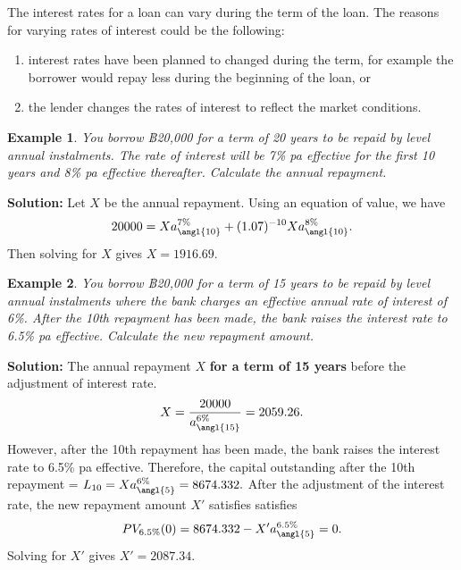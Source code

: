 \documentclass[landscape, 20pt]{extreport}
\theoremstyle{definition}
\theoremstyle{definition}
\newtheorem{example}{Example}[chapter]
\theoremstyle{definition}
\theoremstyle{definition}
\theoremstyle{remark}
\begin{document}
The interest rates for a loan can vary during the term of the loan. The
reasons for varying rates of interest could be the following:

\begin{enumerate}
\def\labelenumi{\arabic{enumi}.}
\item
  interest rates have been planned to changed during the term, for
  example the borrower would repay less during the beginning of the
  loan, or
\item
  the lender changes the rates of interest to reflect the market
  conditions.
\end{enumerate}

\newpage \begin{example}
\emph{You borrow ฿20,000 for a term of 20 years to be repaid by level annual
instalments. The rate of interest will be 7\% pa effective for the first
10 years and 8\% pa effective thereafter. Calculate the annual
repayment.}
\end{example}

\textbf{Solution:} Let \(X\) be the annual repayment. Using an equation of
value, we have
\[20000 = X a^{7\%}_{\angl{10}} + (1.07)^{-10} X a^{8\%}_{\angl{10}}.\]
Then solving for \(X\) gives \(X = 1916.69\).

\newpage \begin{example}
\emph{You borrow ฿20,000 for a term of 15 years to be repaid by level annual
instalments where the bank charges an effective annual rate of interest
of 6\%. After the 10th repayment has been made, the bank raises the
interest rate to 6.5\% pa effective. Calculate the new repayment amount.}
\end{example}

\textbf{Solution:} The annual repayment \(X\) \textbf{for a term of 15 years} before
the adjustment of interest rate.
\[X = \frac{20000}{a^{6\%}_{\angl{15}}} = 2059.26.\] However, after the
10th repayment has been made, the bank raises the interest rate to 6.5\%
pa effective. Therefore, the capital outstanding after the 10th
repayment = \(L_{10} = X a^{6\%}_{\angl{5}} = 8674.332.\) After the
adjustment of the interest rate, the new repayment amount \(X'\) satisfies
satisfies \[PV_{6.5\%}(0) = 8674.332 - X' a^{6.5\%}_{\angl{5}} = 0.\]
Solving for \(X'\) gives \(X' = 2087.34\).
\end{document}
